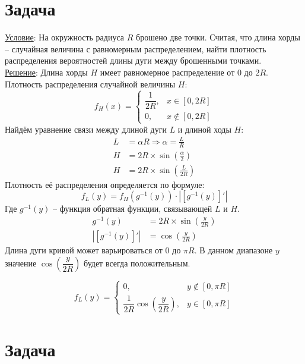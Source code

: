 \documentclass[a4paper,12pt]{article} %
\begin{document}
\newpage
\section{Задача}
\underline{Условие}: На окружность радиуса $R$ брошено две точки. Считая, что длина хорды – случайная величина с равномерным распределением, найти плотность распределения вероятностей длины дуги между брошенными точками.\\
\underline{Решение}:
Длина хорды $H$ имеет равномерное распределение от $0$ до $2R$. Плотность распределения случайной величины $H$:
\[
	f_H(x) = 
	\begin{cases}
		\dfrac{1}{2R}, &x \in [0,2R]\\
		0, &x \notin [0, 2R]
	\end{cases}
\]
Найдём уравнение связи между длиной дуги $L$ и длиной ходы $H$:
\begin{align}
	L &= \alpha R \Rightarrow \alpha  = \frac{L}{R}\\
	H &= 2 R\times \sin\left(\frac{\alpha}{2}\right)\\
	H &= 2 R\times \sin\left(\frac{L}{2 R}\right)	
\end{align}
Плотность её распределения определяется по формуле:
\[
	f_L(y) = f_H(g^{-1}(y))\cdot |[g^{-1}(y)]'|
\]
Где $g^{-1}(y)$ – функция обратная функции, связывающей $L$ и $H$.
\begin{align}
	g^{-1}(y) &= 2R\times \sin\left(\frac{y}{2R}\right)\\
	|[g^{-1}(y)]'| &= \cos\left(\frac{y}{2R}\right)
\end{align}
Длина дуги кривой может варьироваться от $0$ до $\pi  R$. В данном диапазоне $y$ значение $\cos\left(\dfrac{y}{2R}\right)$ будет всегда положительным.

\[
	f_L(y) =
	\begin{cases}
		0, &y\notin [0, \pi R]\\
		\dfrac{1}{2R}\cos\left(\dfrac{y}{2R}\right), &y\in [0, \pi  R]
	\end{cases}
\]
\newline

\section{Задача}
\end{document}
